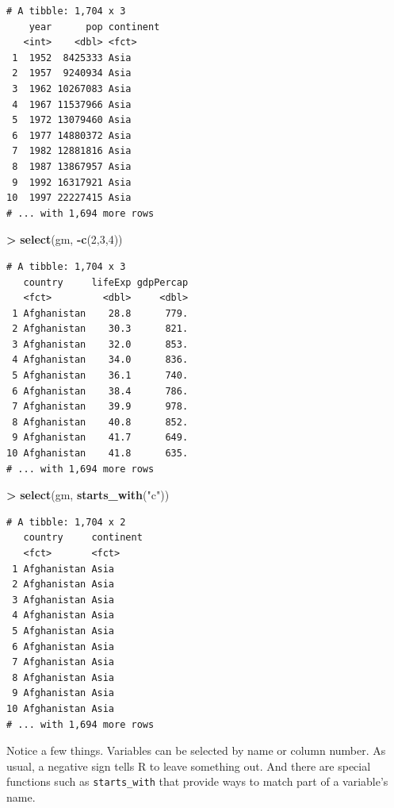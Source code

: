 \documentclass[
]{krantz}
\makeatletter
\newenvironment{Shaded}{\begin{snugshade}}{\end{snugshade}}
\newcommand{\DecValTok}[1]{\textcolor[rgb]{0.06,0.06,0.06}{#1}}
\newcommand{\KeywordTok}[1]{\textcolor[rgb]{0.27,0.27,0.27}{\textbf{#1}}}
\newcommand{\NormalTok}[1]{#1}
\newcommand{\OperatorTok}[1]{\textcolor[rgb]{0.43,0.43,0.43}{\textbf{#1}}}
\newcommand{\StringTok}[1]{\textcolor[rgb]{0.5,0.5,0.5}{#1}}
\newenvironment{kframe}{%
\medskip{}
\setlength{\fboxsep}{.8em}
 \def\at@end@of@kframe{}%
 \ifinner\ifhmode%
  \def\at@end@of@kframe{\end{minipage}}%
  \begin{minipage}{\columnwidth}%
 \fi\fi%
 \def\FrameCommand##1{\hskip\@totalleftmargin \hskip-\fboxsep
 \colorbox{shadecolor}{##1}\hskip-\fboxsep
     \hskip-\linewidth \hskip-\@totalleftmargin \hskip\columnwidth}%
 \MakeFramed {\advance\hsize-\width
   \@totalleftmargin\z@ \linewidth\hsize
   \@setminipage}}%
 {\par\unskip\endMakeFramed%
 \at@end@of@kframe}
\renewenvironment{Shaded}{\begin{kframe}}{\end{kframe}}
\makeatother
\begin{document}
\begin{verbatim}
# A tibble: 1,704 x 3
    year      pop continent
   <int>    <dbl> <fct>    
 1  1952  8425333 Asia     
 2  1957  9240934 Asia     
 3  1962 10267083 Asia     
 4  1967 11537966 Asia     
 5  1972 13079460 Asia     
 6  1977 14880372 Asia     
 7  1982 12881816 Asia     
 8  1987 13867957 Asia     
 9  1992 16317921 Asia     
10  1997 22227415 Asia     
# ... with 1,694 more rows
\end{verbatim}

\begin{Shaded}
\begin{Highlighting}[]
\OperatorTok{\textgreater{}}\StringTok{ }\KeywordTok{select}\NormalTok{(gm, }\OperatorTok{{-}}\KeywordTok{c}\NormalTok{(}\DecValTok{2}\NormalTok{,}\DecValTok{3}\NormalTok{,}\DecValTok{4}\NormalTok{))}
\end{Highlighting}
\end{Shaded}

\begin{verbatim}
# A tibble: 1,704 x 3
   country     lifeExp gdpPercap
   <fct>         <dbl>     <dbl>
 1 Afghanistan    28.8      779.
 2 Afghanistan    30.3      821.
 3 Afghanistan    32.0      853.
 4 Afghanistan    34.0      836.
 5 Afghanistan    36.1      740.
 6 Afghanistan    38.4      786.
 7 Afghanistan    39.9      978.
 8 Afghanistan    40.8      852.
 9 Afghanistan    41.7      649.
10 Afghanistan    41.8      635.
# ... with 1,694 more rows
\end{verbatim}

\begin{Shaded}
\begin{Highlighting}[]
\OperatorTok{\textgreater{}}\StringTok{ }\KeywordTok{select}\NormalTok{(gm, }\KeywordTok{starts\_with}\NormalTok{(}\StringTok{"c"}\NormalTok{))}
\end{Highlighting}
\end{Shaded}

\begin{verbatim}
# A tibble: 1,704 x 2
   country     continent
   <fct>       <fct>    
 1 Afghanistan Asia     
 2 Afghanistan Asia     
 3 Afghanistan Asia     
 4 Afghanistan Asia     
 5 Afghanistan Asia     
 6 Afghanistan Asia     
 7 Afghanistan Asia     
 8 Afghanistan Asia     
 9 Afghanistan Asia     
10 Afghanistan Asia     
# ... with 1,694 more rows
\end{verbatim}

Notice a few things. Variables can be selected by name or column number. As usual, a negative sign tells R to leave something out. And there are special functions such as \texttt{starts\_with} that provide ways to match part of a variable's name.
\end{document}
